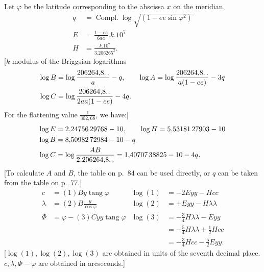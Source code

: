 Let \(\varphi\) be the latitude corresponding to the abscissa \(x\) on the meridian,
\[
\begin{aligned}
q&=\operatorname{Compl.}\log\sqrt{(1-ee\sin\varphi^2)}\\
E&=\frac{1-ee}{6aa}.k.10^7\\
H&=\frac{k.10^7}{3.206265^2}.
\end{aligned}
\]
[\(k\) modulus of the Briggsian logarithms
\[
\begin{aligned}
\log B&=\log\frac{206264{,}8\ldotp\ldotp}a-q,\qquad\log A=\log\frac{206264{,}8\ldotp\ldotp}{a(1-ee)}-3q\\
\log C&=\log\frac{206264{,}8\ldotp\ldotp}{2aa(1-ee)}-4q.
\end{aligned}
\]
For the flattening value \(\frac1{302{,}68}\), we have:]
\[
\begin{aligned}
\log E&=2{,}24756\,29768-10,\qquad\log H=5{,}53181\,27903-10\\
\log B&=8{,}50982\,72984-10-q\\
\log C&=\log\frac{AB}{2.206264{,}8\ldotp\ldotp}=1{,}40707\,38825-10-4q.
\end{aligned}
\]
[To calculate \(A\) and \(B\), the table on p.~84 can be used directly, or \(q\) can be taken from the table on p.~77.]
\[
\begin{aligned}
c&=(1)By\operatorname{tang}\varphi&\log(1)&=-2Eyy-Hcc\\
\lambda&=(2)B\frac y{\cos\varphi}&\log(2)&=+Eyy-H\lambda\lambda\\
\Phi&=\varphi-(3)Cyy\operatorname{tang}\varphi&\log(3)&=-\tfrac34H\lambda\lambda-Eyy\\
&&&=-\tfrac54H\lambda\lambda+\tfrac12Hcc\\
&&&=-\tfrac34Hcc-\tfrac52Eyy.
\end{aligned}
\]
[\(\log(1),\log(2),\log(3)\) are obtained in units of the seventh decimal place. \(c,\lambda,\Phi-\varphi\) are obtained in arcseconds.]
